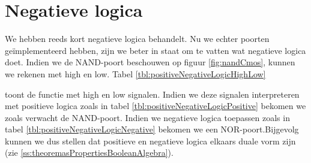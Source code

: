 \section{Negatieve logica}
\label{s:negativeLogic}
We hebben reeds kort negatieve logica behandelt. Nu we echter poorten ge\"implementeerd hebben, zijn we beter in staat om te vatten wat negatieve logica doet. Indien we de NAND-poort beschouwen op figuur \ref{fig:nandCmos}, kunnen we rekenen met high en low. Tabel \ref{tbl:positiveNegativeLogicHighLow}
\begin{table}[hbt]
\centering
{}
\caption{Verschil tussen positieve en negatieve logica.}
\label{tbl:positiveNegativeLogic}
\end{table}
toont de functie met high en low signalen. Indien we deze signalen interpreteren met positieve logica zoals in tabel \ref{tbl:positiveNegativeLogicPositive} bekomen we zoals verwacht de NAND-poort. Indien we negatieve logica toepassen zoals in tabel \ref{tbl:positiveNegativeLogicNegative} bekomen we een NOR-poort.Bijgevolg kunnen we dus stellen dat positieve en negatieve logica elkaars duale vorm zijn (zie \ref{ss:theoremasPropertiesBooleanAlgebra}).
